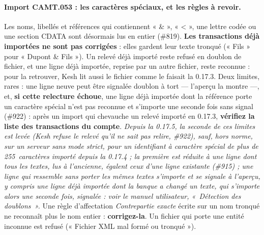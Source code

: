 \documentclass[a4paper,11pt,oneside]{article}
\begin{document}
\begin{sloppypar}
\paragraph{Import CAMT.053 : les caractères spéciaux, et les règles à revoir.} Les noms, libellés et références qui contiennent « \& », « < », une lettre codée ou une section CDATA sont désormais lus en entier (\#819). \textbf{Les transactions déjà importées ne sont pas corrigées} : elles gardent leur texte tronqué (« Fils » pour « Dupont \& Fils »). Un relevé déjà importé reste refusé en doublon de fichier, et une ligne déjà importée, reprise par un autre fichier, reste reconnue : pour la retrouver, Kesh lit aussi le fichier comme le faisait la 0.17.3. Deux limites, rares : une ligne neuve peut être signalée doublon à tort --- l'aperçu la montre ---, et, \textbf{si cette relecture échoue}, une ligne déjà importée dont la référence porte un caractère spécial n'est pas reconnue et s'importe une seconde fois sans signal (\#922) : après un import qui chevauche un relevé importé en 0.17.3, \textbf{vérifiez la liste des transactions du compte}. \emph{Depuis la 0.17.5, la seconde de ces limites est levée (Kesh refuse le relevé qu'il ne sait pas relire, \#922), sauf, hors norme, sur un serveur sans mode strict, pour un identifiant à caractère spécial de plus de 255~caractères importé depuis la 0.17.4 ; la première est réduite à une ligne dont tous les textes, lus à l'ancienne, égalent ceux d'une ligne existante (\#915) ; une ligne qui ressemble sans porter les mêmes textes s'importe et se signale à l'aperçu, y compris une ligne déjà importée dont la banque a changé un texte, qui s'importe alors une seconde fois, signalée : voir le manuel utilisateur, «~Détection des doublons~».} Une règle d'affectation \emph{Contrepartie exacte} écrite sur un nom tronqué ne reconnaît plus le nom entier : \textbf{corrigez-la}. Un fichier qui porte une entité inconnue est refusé (« Fichier XML mal formé ou tronqué »).
\end{sloppypar}
\end{document}
